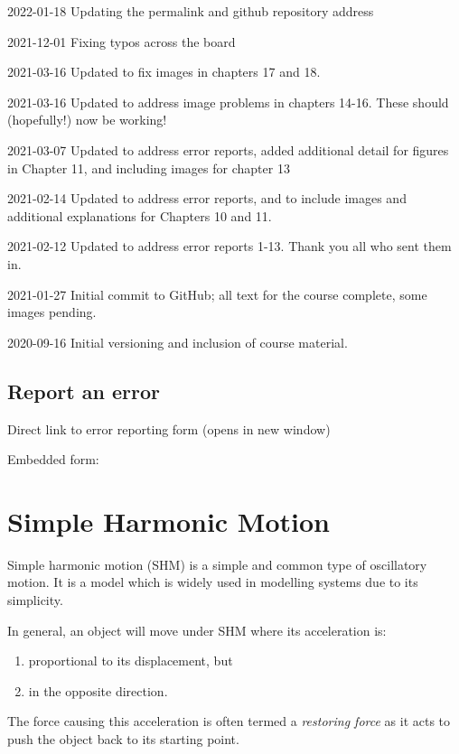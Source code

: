 \documentclass[
]{book}
\providecommand{\tightlist}{%
  \setlength{\itemsep}{0pt}\setlength{\parskip}{0pt}}
\begin{document}
2022-01-18 Updating the permalink and github repository address

2021-12-01 Fixing typos across the board

2021-03-16 Updated to fix images in chapters 17 and 18.

2021-03-16 Updated to address image problems in chapters 14-16. These should (hopefully!) now be working!

2021-03-07 Updated to address error reports, added additional detail for figures in Chapter 11, and including images for chapter 13

2021-02-14 Updated to address error reports, and to include images and additional explanations for Chapters 10 and 11.

2021-02-12 Updated to address error reports 1-13. Thank you all who sent them in.

2021-01-27 Initial commit to GitHub; all text for the course complete, some images pending.

2020-09-16 Initial versioning and inclusion of course material.

\hypertarget{report-an-error}{%
\section*{Report an error}\label{report-an-error}}

Direct link to error reporting form (opens in new window)

Embedded form:

\hypertarget{sec-shm}{%
\chapter{Simple Harmonic Motion}\label{sec-shm}}

Simple harmonic motion (SHM) is a simple and common type of oscillatory motion. It is a model which is widely used in modelling systems due to its simplicity.

In general, an object will move under SHM where its acceleration is:

\begin{enumerate}
\def\labelenumi{\arabic{enumi}.}
\tightlist
\item
  proportional to its displacement, but
\item
  in the opposite direction.
\end{enumerate}

The force causing this acceleration is often termed a \emph{restoring force} as it acts to push the object back to its starting point.
\end{document}
